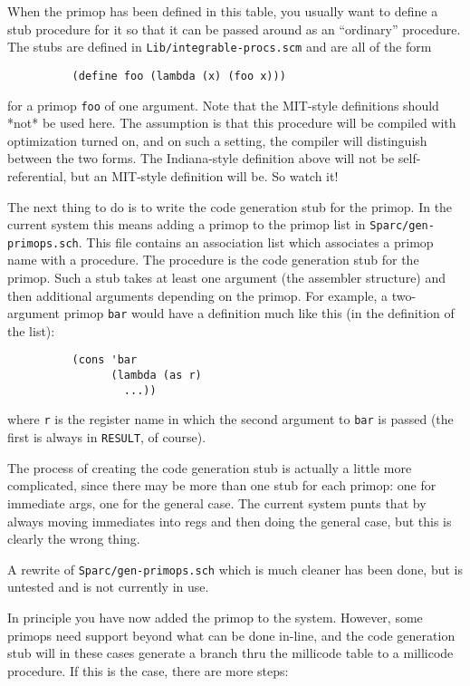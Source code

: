 When the primop has been defined in this table, you usually want to define
a stub procedure for it so that it can be passed around as an ``ordinary''
procedure. The stubs are defined in {\tt Lib/integrable-procs.scm} and are
all of the form

\begin{verbatim}
          (define foo (lambda (x) (foo x)))
\end{verbatim}

for a primop {\tt foo} of one argument. Note that the MIT-style definitions
should *not* be used here. The assumption is that this procedure will be
compiled with optimization turned on, and on such a setting, the compiler
will distinguish between the two forms. The Indiana-style definition above
will not be self-referential, but an MIT-style definition will be. So watch
it!

The next thing to do is to write the code generation stub for the primop. In
the current system this means adding a primop to the primop list in
{\tt Sparc/gen-primops.sch}. This file contains an association list which
associates a primop name with a procedure. The procedure is the code generation
stub for the primop. Such a stub takes at least one argument (the assembler
structure) and then additional arguments depending on the primop. For
example, a two-argument primop {\tt bar} would have a definition much like
this (in the definition of the list):

\begin{minipage}{\linewidth}
\begin{verbatim}
          (cons 'bar
                (lambda (as r)
                  ...))
\end{verbatim}
\end{minipage}

where {\tt r} is the register name in which the second argument to {\tt bar}
is passed (the first is always in {\tt RESULT}, of course).

The process of creating the code generation stub is actually a little more
complicated, since there may be more than one stub for each primop: one
for immediate args, one for the general case. The current system punts that
by always moving immediates into regs and then doing the general case, but
this is clearly the wrong thing.

A rewrite of {\tt Sparc/gen-primops.sch} which is much cleaner has been
done, but is untested and is not currently in use.

In principle you have now added the primop to the system. However, some
primops need support beyond what can be done in-line, and the code
generation stub will in these cases generate a branch thru the millicode
table to a millicode procedure. If this is the case, there are more steps:

